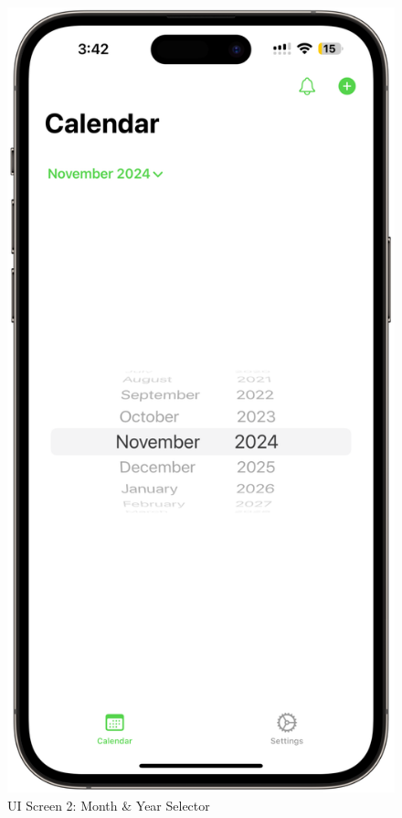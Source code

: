 \begin{figure}[!h]
\begin{minipage}{0.3\textwidth}
        \includegraphics[width=\textwidth]{images/screen2.png}
        \caption{UI Screen 2: Month \& Year Selector}
        \label{fig:ui-screen-2}
    \end{minipage}
\end{figure}

